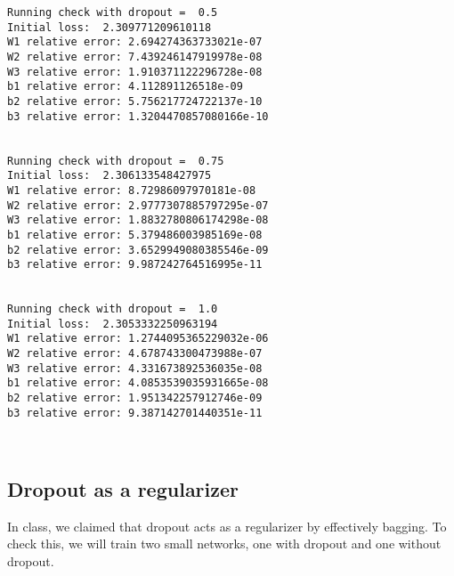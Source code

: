 \documentclass[11pt]{article}
\begin{document}
    \begin{Verbatim}[commandchars=\\\{\}]
Running check with dropout =  0.5
Initial loss:  2.309771209610118
W1 relative error: 2.694274363733021e-07
W2 relative error: 7.439246147919978e-08
W3 relative error: 1.910371122296728e-08
b1 relative error: 4.112891126518e-09
b2 relative error: 5.756217724722137e-10
b3 relative error: 1.3204470857080166e-10


Running check with dropout =  0.75
Initial loss:  2.306133548427975
W1 relative error: 8.72986097970181e-08
W2 relative error: 2.9777307885797295e-07
W3 relative error: 1.8832780806174298e-08
b1 relative error: 5.379486003985169e-08
b2 relative error: 3.6529949080385546e-09
b3 relative error: 9.987242764516995e-11


Running check with dropout =  1.0
Initial loss:  2.3053332250963194
W1 relative error: 1.2744095365229032e-06
W2 relative error: 4.678743300473988e-07
W3 relative error: 4.331673892536035e-08
b1 relative error: 4.0853539035931665e-08
b2 relative error: 1.951342257912746e-09
b3 relative error: 9.387142701440351e-11



    \end{Verbatim}

    \hypertarget{dropout-as-a-regularizer}{%
\subsection{Dropout as a regularizer}\label{dropout-as-a-regularizer}}

In class, we claimed that dropout acts as a regularizer by effectively
bagging. To check this, we will train two small networks, one with
dropout and one without dropout.
\end{document}
